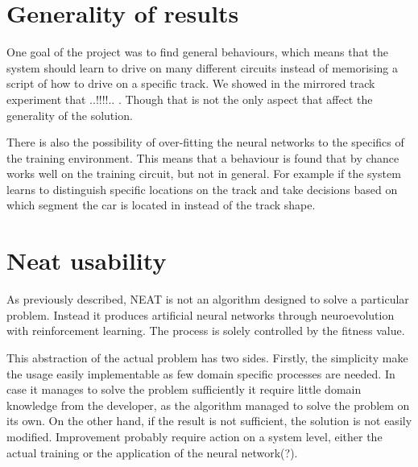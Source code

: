 \section{Generality of results}

One goal of the project was to find general behaviours, which means that the system should learn to drive on many different circuits instead of memorising a script of how to drive on a specific track. We showed in the mirrored track experiment that ..!!!!.. . Though that is not the only aspect that affect the generality of the solution. 

There is also the possibility of over-fitting the neural networks to the specifics of the training environment. This means that a behaviour is found that by chance works well on the training circuit, but not in general. For example if the system learns to distinguish specific locations on the track and take decisions based on which segment the car is located in instead of the track shape.




\section{Neat usability}

As previously described, NEAT is not an algorithm designed to solve a particular problem. Instead it produces artificial neural networks through neuroevolution with reinforcement learning. The process is solely controlled by the fitness value.

This abstraction of the actual problem has two sides. Firstly, the simplicity make the usage easily implementable as few domain specific processes are needed. In case it manages to solve the problem sufficiently it require little domain knowledge from the developer, as the algorithm managed to solve the problem on its own. On the other hand, if the result is not sufficient, the solution is not easily modified. Improvement probably require action on a system level, either the actual training or the application of the neural network(?).

